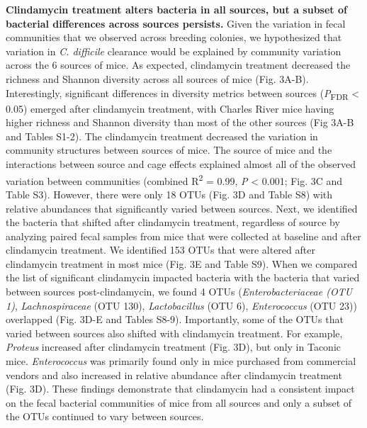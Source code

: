 \documentclass[
  11pt,
]{article}
\begin{document}
\textbf{Clindamycin treatment alters bacteria in all sources, but a
subset of bacterial differences across sources persists.} Given the
variation in fecal communities that we observed across breeding
colonies, we hypothesized that variation in \emph{C. difficile}
clearance would be explained by community variation across the 6 sources
of mice. As expected, clindamycin treatment decreased the richness and
Shannon diversity across all sources of mice (Fig. 3A-B). Interestingly,
significant differences in diversity metrics between sources
(\emph{P}\textsubscript{FDR} \textless{} 0.05) emerged after clindamycin
treatment, with Charles River mice having higher richness and Shannon
diversity than most of the other sources (Fig 3A-B and Tables S1-2). The
clindamycin treatment decreased the variation in community structures
between sources of mice. The source of mice and the interactions between
source and cage effects explained almost all of the observed variation
between communities (combined R\textsuperscript{2} = 0.99, \emph{P}
\textless{} 0.001; Fig. 3C and Table S3). However, there were only 18
OTUs (Fig. 3D and Table S8) with relative abundances that significantly
varied between sources. Next, we identified the bacteria that shifted
after clindamycin treatment, regardless of source by analyzing paired
fecal samples from mice that were collected at baseline and after
clindamycin treatment. We identified 153 OTUs that were altered after
clindamycin treatment in most mice (Fig. 3E and Table S9). When we
compared the list of significant clindamycin impacted bacteria with the
bacteria that varied between sources post-clindamycin, we found 4 OTUs
(\emph{Enterobacteriaceae (OTU 1)}, \emph{Lachnospiraceae} (OTU 130),
\emph{Lactobacillus} (OTU 6), \emph{Enterococcus} (OTU 23)) overlapped
(Fig. 3D-E and Tables S8-9). Importantly, some of the OTUs that varied
between sources also shifted with clindamycin treatment. For example,
\emph{Proteus} increased after clindamycin treatment (Fig. 3D), but only
in Taconic mice. \emph{Enterococcus} was primarily found only in mice
purchased from commercial vendors and also increased in relative
abundance after clindamycin treatment (Fig. 3D). These findings
demonstrate that clindamycin had a consistent impact on the fecal
bacterial communities of mice from all sources and only a subset of the
OTUs continued to vary between sources.
\end{document}
